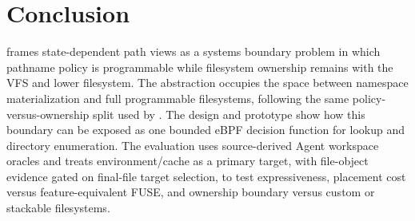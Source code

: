 \section{Conclusion}
\label{sec:conclusion}

\namei frames state-dependent path views as a systems boundary problem in which
pathname policy is programmable while filesystem ownership remains with the VFS
and lower filesystem. The abstraction occupies the space between namespace
materialization and full programmable filesystems, following the same
policy-versus-ownership split used by . The design and
prototype show how this boundary can be exposed as one bounded eBPF decision
function for lookup and directory enumeration. The evaluation uses
source-derived Agent workspace oracles and treats environment/cache as a
primary target, with file-object evidence gated on final-file target selection,
to test expressiveness, placement cost versus feature-equivalent FUSE, and
ownership boundary versus custom or stackable filesystems.
